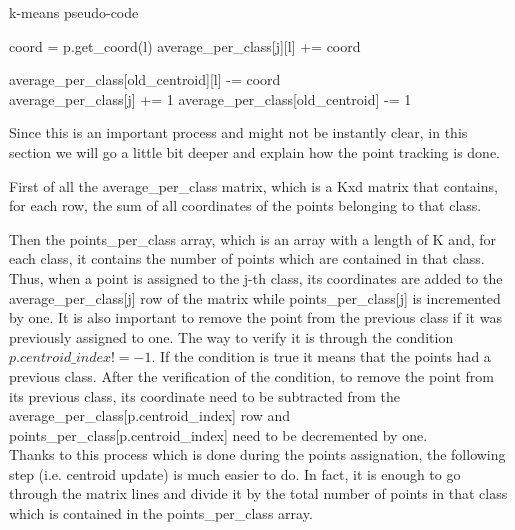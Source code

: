 \documentclass{report}
\begin{document}
\begin{minipage}[b]{0.48\textwidth}
    \begin{algorithm}[H]
        \caption{k-means pseudo-code}\label{alg:cap}
        \begin{algorithmic}
                \State coord = p.get\_coord(l)
                \State average\_per\_class[j][l] += coord

                    \State average\_per\_class[old\_centroid][l] -= coord
                \EndIf
            \EndFor\\

            \State average\_per\_class[j] += 1
                \State average\_per\_class[old\_centroid] -= 1
            \EndIf
        \end{algorithmic}
    \end{algorithm}

    Since this is an important process and might not be instantly clear, in this section we will go a little bit deeper and explain how the point tracking is done.

    First of all the average\_per\_class matrix, which is a Kxd matrix that contains, for each row, the sum of all coordinates of the points belonging to that class.

    Then the points\_per\_class array, which is an array with a length of K and, for each class, it contains the number of points which are contained in that class.\\

    Thus, when a point is assigned to the j-th class, its coordinates are added to the average\_per\_class[j] row of the matrix while points\_per\_class[j] is incremented by one.
    It is also important to remove the point from the previous class if it was previously assigned to one. The way to verify it is through the condition $p.centroid\_index != -1$. If the condition is true it means that the points had a previous class. After the verification of the condition, to remove the point from its previous class, its coordinate need to be subtracted from the average\_per\_class[p.centroid\_index] row and points\_per\_class[p.centroid\_index] need to be decremented by one.\\

    Thanks to this process which is done during the points assignation, the following step (i.e. centroid update) is much easier to do. In fact, it is enough to go through the matrix lines and divide it by the total number of points in that class which is contained in the points\_per\_class array.


\end{minipage}
\end{document}
